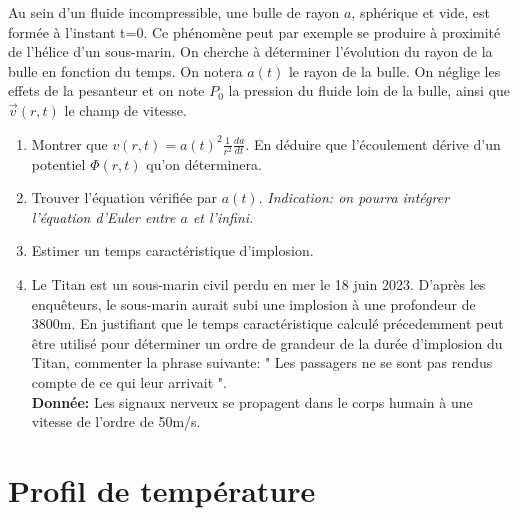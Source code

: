 \documentclass{article}
\begin{document}
Au sein d'un fluide incompressible, une bulle de rayon $a$, sphérique et vide, est formée à l'instant t=0. 
Ce phénomène peut par exemple se produire à proximité de l'hélice d'un sous-marin. 
On cherche à déterminer l'évolution du rayon de la bulle en fonction du temps.
On notera $a(t)$ le rayon de la bulle. 
On néglige les effets de la pesanteur et on note $P_0$ la pression du fluide loin de la bulle, ainsi que $\vec{v}(r,t)$ le champ de vitesse. 
\begin{enumerate}
    \item Montrer que $v(r,t)=a(t)^2 \frac{1}{r^2} \frac{da}{dt}$. 
    En déduire que l'écoulement dérive d'un potentiel $\Phi(r,t)$ qu'on déterminera. 
    \item Trouver l'équation vérifiée par $a(t)$. 
    \textit{ Indication: on pourra intégrer l'équation d'Euler entre $a$ et l'infini. }
    \item Estimer un temps caractéristique d'implosion. 
    \item Le Titan est un sous-marin civil perdu en mer le 18 juin 2023.
    D'après les enquêteurs, le sous-marin aurait subi une implosion à une profondeur de 3800m. 
    En justifiant que le temps caractéristique calculé précedemment peut être utilisé pour déterminer un ordre de grandeur de la durée d'implosion du Titan, commenter la phrase suivante: 
    " Les passagers ne se sont pas rendus compte de ce qui leur arrivait ". 
    \\[0.1cm]
    \textbf{Donnée: } Les signaux nerveux se propagent dans le corps humain à une vitesse de l'ordre de 50m/s.
\end{enumerate}


\section{Profil de température}
\end{document}
